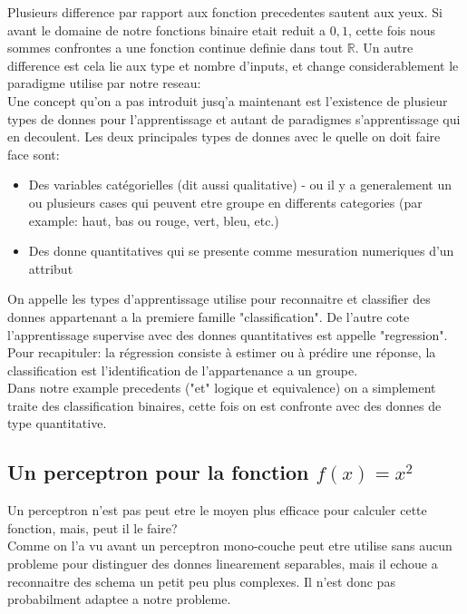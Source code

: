 \documentclass[twoside,openright,a4paper,11pt,french]{article}
\begin{document}
Plusieurs difference par rapport aux fonction precedentes sautent aux yeux.
Si avant le domaine de notre fonctions binaire etait reduit a ${0,1}$, cette
fois nous sommes confrontes a une fonction continue definie dans tout $\mathbb{R}$.
Un autre difference est cela lie aux type et nombre d'inputs, et change
considerablement le paradigme utilise par notre reseau:\\

Une concept qu'on a pas introduit jusq'a maintenant est l'existence de plusieur
types de donnes pour l'apprentissage et autant de paradigmes s'apprentissage qui en
decoulent. Les deux principales types de donnes avec le quelle on doit faire
face sont:

\begin{itemize}
\item Des variables catégorielles (dit aussi qualitative) - ou il y a generalement
      un ou plusieurs cases qui peuvent etre groupe en differents categories 
     (par example: haut, bas ou rouge, vert, bleu, etc.)
\item Des donne quantitatives qui se presente comme mesuration numeriques d'un attribut
\end{itemize}

On appelle les types d'apprentissage utilise pour reconnaitre et classifier des donnes
appartenant a la premiere famille "classification". De l'autre cote l'apprentissage
supervise avec des donnes quantitatives est appelle "regression".\cite{kindsNN}\\

Pour recapituler: la régression consiste à estimer ou à prédire une réponse,
la classification est l'identification de l'appartenance a un groupe.\\

Dans notre example precedents ("et" logique et equivalence) on a simplement
traite des classification binaires, cette fois on est confronte avec des donnes
de type quantitative.


\subsection{Un perceptron pour la fonction $f(x) = x^2$}
Un perceptron n'est pas peut etre le moyen plus efficace pour calculer cette 
fonction, mais, peut il le faire?\\

Comme on l'a vu avant un perceptron mono-couche peut etre utilise sans aucun
probleme pour distinguer des donnes linearement separables, mais il echoue 
a reconnaitre des schema un petit peu plus complexes. Il n'est donc pas 
probabilment adaptee a notre probleme.\\
\end{document}
